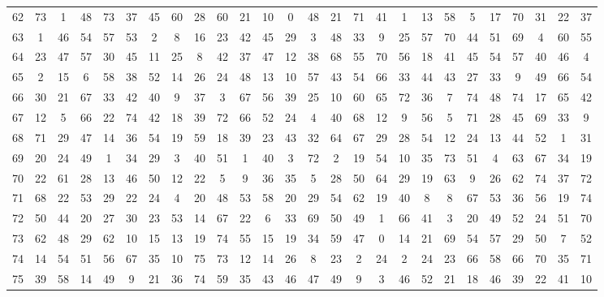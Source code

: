 \begin{table}
\begin{tabular}{c c c c c c c c c c c c c c c c c c c c c c c c c c }
62 & 73 & 1 & 48 & 73 & 37 & 45 & 60 & 28 & 60 & 21 & 10 & 0 & 48 & 21 & 71 & 41 & 1 & 13 & 58 & 5 & 17 & 70 & 31 & 22 & 37 \\
63 & 1 & 46 & 54 & 57 & 53 & 2 & 8 & 16 & 23 & 42 & 45 & 29 & 3 & 48 & 33 & 9 & 25 & 57 & 70 & 44 & 51 & 69 & 4 & 60 & 55 \\
64 & 23 & 47 & 57 & 30 & 45 & 11 & 25 & 8 & 42 & 37 & 47 & 12 & 38 & 68 & 55 & 70 & 56 & 18 & 41 & 45 & 54 & 57 & 40 & 46 & 4 \\
65 & 2 & 15 & 6 & 58 & 38 & 52 & 14 & 26 & 24 & 48 & 13 & 10 & 57 & 43 & 54 & 66 & 33 & 44 & 43 & 27 & 33 & 9 & 49 & 66 & 54 \\
66 & 30 & 21 & 67 & 33 & 42 & 40 & 9 & 37 & 3 & 67 & 56 & 39 & 25 & 10 & 60 & 65 & 72 & 36 & 7 & 74 & 48 & 74 & 17 & 65 & 42 \\
67 & 12 & 5 & 66 & 22 & 74 & 42 & 18 & 39 & 72 & 66 & 52 & 24 & 4 & 40 & 68 & 12 & 9 & 56 & 5 & 71 & 28 & 45 & 69 & 33 & 9 \\
68 & 71 & 29 & 47 & 14 & 36 & 54 & 19 & 59 & 18 & 39 & 23 & 43 & 32 & 64 & 67 & 29 & 28 & 54 & 12 & 24 & 13 & 44 & 52 & 1 & 31 \\
69 & 20 & 24 & 49 & 1 & 34 & 29 & 3 & 40 & 51 & 1 & 40 & 3 & 72 & 2 & 19 & 54 & 10 & 35 & 73 & 51 & 4 & 63 & 67 & 34 & 19 \\
70 & 22 & 61 & 28 & 13 & 46 & 50 & 12 & 22 & 5 & 9 & 36 & 35 & 5 & 28 & 50 & 64 & 29 & 19 & 63 & 9 & 26 & 62 & 74 & 37 & 72 \\
71 & 68 & 22 & 53 & 29 & 22 & 24 & 4 & 20 & 48 & 53 & 58 & 20 & 29 & 54 & 62 & 19 & 40 & 8 & 8 & 67 & 53 & 36 & 56 & 19 & 74 \\
72 & 50 & 44 & 20 & 27 & 30 & 23 & 53 & 14 & 67 & 22 & 6 & 33 & 69 & 50 & 49 & 1 & 66 & 41 & 3 & 20 & 49 & 52 & 24 & 51 & 70 \\
73 & 62 & 48 & 29 & 62 & 10 & 15 & 13 & 19 & 74 & 55 & 15 & 19 & 34 & 59 & 47 & 0 & 14 & 21 & 69 & 54 & 57 & 29 & 50 & 7 & 52 \\
74 & 14 & 54 & 51 & 56 & 67 & 35 & 10 & 75 & 73 & 12 & 14 & 26 & 8 & 23 & 2 & 24 & 2 & 24 & 23 & 66 & 58 & 66 & 70 & 35 & 71 \\
75 & 39 & 58 & 14 & 49 & 9 & 21 & 36 & 74 & 59 & 35 & 43 & 46 & 47 & 49 & 9 & 3 & 46 & 52 & 21 & 18 & 46 & 39 & 22 & 41 & 10 \\
\hline
\end{tabular}
\end{table}